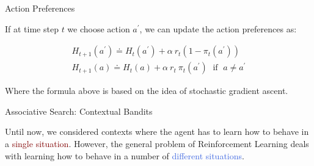 \documentclass{beamer}
\begin{document}






\begin{frame}{Action Preferences}

If at time step $t$ we choose action $a^{\prime}$, we can update the action preferences as:

\begin{align*}
H_{t+1}(a^{\prime}) \doteq H_t(a^{\prime}) + \alpha \: r_t (1 - \pi_t(a^{\prime}))\\
H_{t+1}(a) \doteq H_t(a) + \alpha \: r_t \: \pi_t(a^{\prime}) \; \text{ if } \; a \neq a^{\prime}
\end{align*}

\vspace{2mm}

Where the formula above is based on the idea of stochastic gradient ascent.


\end{frame}

\begin{frame}{Associative Search: Contextual Bandits}

Until now, we considered contexts where the agent has to learn how to behave in a \textcolor{Maroon}{single situation}.
However, the general problem of Reinforcement Learning deals with learning how to behave in a number of \textcolor{RoyalBlue}{different situations}.

\end{frame}
\end{document}
